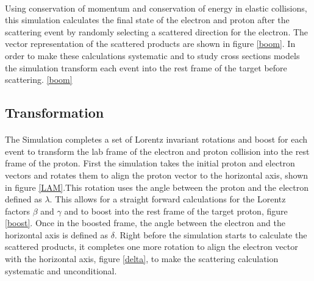 \paragraph{}
Using conservation of momentum and conservation of energy in elastic collisions, this simulation calculates the final state of the electron and proton after the scattering event by randomly selecting a scattered direction for the electron. The vector representation of the scattered products are shown in figure \ref{boom}. In order to make these calculations systematic and to study cross sections models the simulation transform each event into the rest frame of the target before scattering. \ref{boom}

\subsection{Transformation}\paragraph{}
The Simulation completes a set of Lorentz invariant  rotations and boost for each event to transform the lab frame of the electron and proton collision into the rest frame of the proton. First the simulation takes the initial proton and electron vectors and rotates them to align the proton vector to the horizontal axis, shown in figure \ref{LAM}.This rotation uses the angle between the proton and the electron defined as $\lambda$. This allows for a straight forward calculations for the Lorentz factors $\beta$ and $\gamma $ and to boost into the rest frame of the target proton, figure \ref{boost}. Once in the boosted frame, the angle between the electron and the horizontal axis is defined as $\delta$.  Right before the simulation starts to calculate the scattered products, it completes one more rotation to align the electron vector with the horizontal axis, figure \ref{delta}, to make the scattering calculation systematic and unconditional. 

